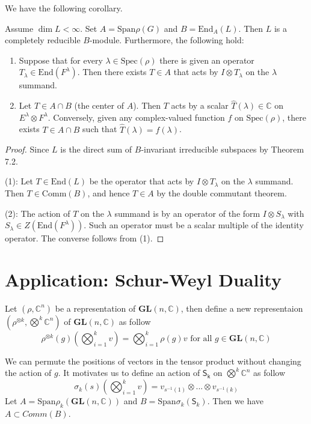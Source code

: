 \documentclass[12pt]{article}
\newcommand{\C}{\mathbb{C}}
\newenvironment{corollary}[2][Corollary]{\begin{trivlist}
\item[\hskip \labelsep {\bfseries #1}\hskip \labelsep {\bfseries #2.}]}{\end{trivlist}}
\begin{document}
    We have the following corollary.
    \begin{corollary}{7.4}
    Assume $\dim L < \infty$. Set $A = \mathrm{Span}\rho(G)$ and $B = \mathrm{End}_A(L)$. Then $L$ is a completely reducible $B$-module. Furthermore, the following hold:

    \begin{enumerate}
        \item Suppose that for every $\lambda \in \mathrm{Spec}(\rho)$ there is given an operator $T_\lambda \in \mathrm{End}(F^\lambda)$. Then there exists $T \in A$ that acts by $I \otimes T_\lambda$ on the $\lambda$ summand.
        \item Let $T \in A \cap B$ (the center of $A$). Then $T$ acts by a scalar $\hat{T}(\lambda) \in \mathbb{C}$ on $E^\lambda \otimes F^\lambda$. Conversely, given any complex-valued function $f$ on $\mathrm{Spec}(\rho)$, there exists $T \in A \cap B$ such that $\hat{T}(\lambda) = f(\lambda)$.
    \end{enumerate}
    \end{corollary}

    \begin{proof}
    Since $L$ is the direct sum of $B$-invariant irreducible subspaces by Theorem 7.2.
    
    (1): Let $T \in \mathrm{End}(L)$ be the operator that acts by $I \otimes T_\lambda$ on the $\lambda$ summand. Then $T \in \mathrm{Comm}(B)$, and hence $T \in A$ by the double commutant theorem.
    
    (2): The action of $T$ on the $\lambda$ summand is by an operator of the form $I \otimes S_\lambda$ with $S_\lambda \in Z(\mathrm{End}(F^\lambda))$. Such an operator must be a scalar multiple of the identity operator. The converse follows from (1).
    \end{proof}
\section{Application: Schur-Weyl Duality}
Let $(\rho, \C^n)$ be a representation of $\mathbf{GL}(n,\C)$, then define a new representaion $(\rho^{\otimes k},\bigotimes^k \C^n)$ of $\mathbf{GL}(n,\C)$ as follow
$$
\rho^{\otimes k}(g)(\bigotimes_{i=1}^kv)=\bigotimes_{i=1}^k\rho(g)v \text{ for all }g\in\mathbf{GL}(n,\C)
$$

We can permute the positions of vectors in the tensor product without changing the action of $g$. It motivates us to define an action of $\mathsf{S_k}$ on $\bigotimes^k \C^n$ as follow
$$
{\sigma}_k(s)(\bigotimes_{i=1}^kv)=v_{s^{-1}(1)}\otimes...\otimes v_{s^{-1}(k)}
$$
Let $A = \mathrm{Span}\rho_k(\mathbf{GL}(n,\C))$ and $B = \mathrm{Span}\sigma_k(\mathsf{S}_k)$. Then we have $A\subset Comm(B)$.
\end{document}
